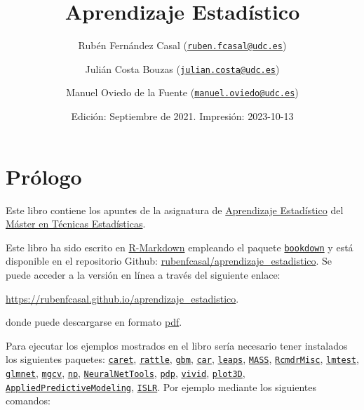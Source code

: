 \documentclass[
]{book}
\title{Aprendizaje Estadístico}
\author{Rubén Fernández Casal (\href{mailto:ruben.fcasal@udc.es}{\nolinkurl{ruben.fcasal@udc.es}}) \and Julián Costa Bouzas (\href{mailto:julian.costa@udc.es}{\nolinkurl{julian.costa@udc.es}}) \and Manuel Oviedo de la Fuente (\href{mailto:manuel.oviedo@udc.es}{\nolinkurl{manuel.oviedo@udc.es}})}
\date{Edición: Septiembre de 2021. Impresión: 2023-10-13}
\theoremstyle{break}
\theoremstyle{nonumberplain}
\begin{document}
\maketitle

{
\setcounter{tocdepth}{1}
\tableofcontents
}
\hypertarget{pruxf3logo}{%
\chapter*{Prólogo}\label{pruxf3logo}}

Este libro contiene los apuntes de la asignatura de \href{http://eamo.usc.es/pub/mte/index.php?option=com_content\&view=article\&id=74}{Aprendizaje Estadístico} del \href{http://eio.usc.es/pub/mte}{Máster en Técnicas Estadísticas}.

Este libro ha sido escrito en \href{http://rmarkdown.rstudio.com}{R-Markdown} empleando el paquete \href{https://bookdown.org/yihui/bookdown/}{\texttt{bookdown}} y está disponible en el repositorio Github: \href{https://github.com/rubenfcasal/aprendizaje_estadistico}{rubenfcasal/aprendizaje\_estadistico}.
Se puede acceder a la versión en línea a través del siguiente enlace:

\url{https://rubenfcasal.github.io/aprendizaje_estadistico}.

donde puede descargarse en formato \href{https://rubenfcasal.github.io/aprendizaje_estadistico/aprendizaje_estadistico.pdf}{pdf}.

Para ejecutar los ejemplos mostrados en el libro sería necesario tener instalados los siguientes paquetes:
\href{https://CRAN.R-project.org/package=caret}{\texttt{caret}}, \href{https://CRAN.R-project.org/package=rattle}{\texttt{rattle}}, \href{https://CRAN.R-project.org/package=gbm}{\texttt{gbm}}, \href{https://CRAN.R-project.org/package=car}{\texttt{car}}, \href{https://CRAN.R-project.org/package=leaps}{\texttt{leaps}}, \href{https://CRAN.R-project.org/package=MASS}{\texttt{MASS}}, \href{https://CRAN.R-project.org/package=RcmdrMisc}{\texttt{RcmdrMisc}}, \href{https://CRAN.R-project.org/package=lmtest}{\texttt{lmtest}}, \href{https://CRAN.R-project.org/package=glmnet}{\texttt{glmnet}}, \href{https://CRAN.R-project.org/package=mgcv}{\texttt{mgcv}}, \href{https://CRAN.R-project.org/package=np}{\texttt{np}}, \href{https://CRAN.R-project.org/package=NeuralNetTools}{\texttt{NeuralNetTools}}, \href{https://CRAN.R-project.org/package=pdp}{\texttt{pdp}}, \href{https://CRAN.R-project.org/package=vivid}{\texttt{vivid}}, \href{https://CRAN.R-project.org/package=plot3D}{\texttt{plot3D}}, \href{https://CRAN.R-project.org/package=AppliedPredictiveModeling}{\texttt{AppliedPredictiveModeling}}, \href{https://CRAN.R-project.org/package=ISLR}{\texttt{ISLR}}.
Por ejemplo mediante los siguientes comandos:
\end{document}
